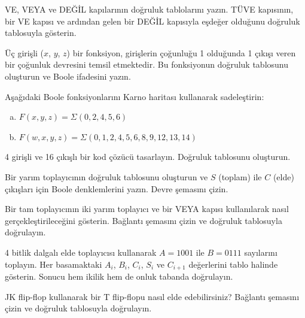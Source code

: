 \begin{alistirma}[\kolay]
VE, VEYA ve DEĞİL kapılarının doğruluk tablolarını yazın. TÜVE kapısının, bir VE kapısı ve ardından gelen bir DEĞİL kapısıyla eşdeğer olduğunu doğruluk tablosuyla gösterin.
\end{alistirma}

\begin{alistirma}[\orta]
Üç girişli ($x$, $y$, $z$) bir fonksiyon, girişlerin çoğunluğu 1 olduğunda 1 çıkışı veren bir çoğunluk devresini temsil etmektedir. Bu fonksiyonun doğruluk tablosunu oluşturun ve Boole ifadesini yazın.
\end{alistirma}

\begin{alistirma}[\orta]
Aşağıdaki Boole fonksiyonlarını Karno haritası kullanarak sadeleştirin:
\begin{enumerate}[(a)]
    \item $F(x,y,z) = \Sigma(0, 2, 4, 5, 6)$
    \item $F(w,x,y,z) = \Sigma(0, 1, 2, 4, 5, 6, 8, 9, 12, 13, 14)$
\end{enumerate}
\end{alistirma}

\begin{alistirma}[\orta]
4 girişli ve 16 çıkışlı bir kod çözücü tasarlayın. Doğruluk tablosunu oluşturun.
\end{alistirma}

\begin{alistirma}[\orta]
Bir yarım toplayıcının doğruluk tablosunu oluşturun ve $S$ (toplam) ile $C$ (elde) çıkışları için Boole denklemlerini yazın. Devre şemasını çizin.
\end{alistirma}

\begin{alistirma}[\orta]
Bir tam toplayıcının iki yarım toplayıcı ve bir VEYA kapısı kullanılarak nasıl gerçekleştirileceğini gösterin. Bağlantı şemasını çizin ve doğruluk tablosuyla doğrulayın.
\end{alistirma}

\begin{alistirma}[\orta]
4 bitlik dalgalı elde toplayıcısı kullanarak $A = 1001$ ile $B = 0111$ sayılarını toplayın. Her basamaktaki $A_i$, $B_i$, $C_i$, $S_i$ ve $C_{i+1}$ değerlerini tablo halinde gösterin. Sonucu hem ikilik hem de onluk tabanda doğrulayın.
\end{alistirma}

\begin{alistirma}[\orta]
JK flip-flop kullanarak bir T flip-flopu nasıl elde edebilirsiniz? Bağlantı şemasını çizin ve doğruluk tablosuyla doğrulayın.
\end{alistirma}

